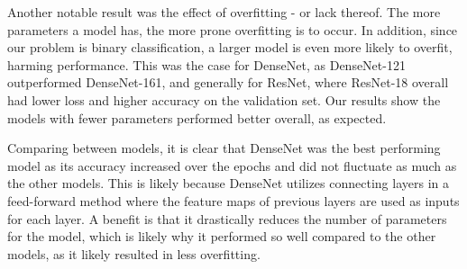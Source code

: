 \documentclass{article}
\begin{document}
Another notable result was the effect of overfitting - or lack thereof. The more parameters a model has, the more prone overfitting is to occur. In addition, since our problem is binary classification, a larger model is even more likely to overfit, harming performance. This was the case for DenseNet, as DenseNet-121 outperformed DenseNet-161, and generally for ResNet, where ResNet-18 overall had lower loss and higher accuracy on the validation set. Our results show the models with fewer parameters performed better overall, as expected.

Comparing between models, it is clear that DenseNet was the best performing model as its accuracy increased over the epochs and did not fluctuate as much as the other models. This is likely because DenseNet utilizes connecting layers in a feed-forward method where the feature maps of previous layers are used as inputs for each layer. A benefit is that it drastically reduces the number of parameters for the model, which is likely why it performed so well compared to the other models, as it likely resulted in less overfitting.
\end{document}
